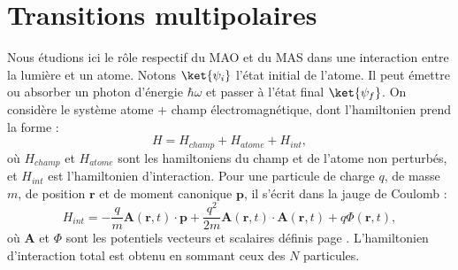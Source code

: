 \section{Transitions multipolaires}
Nous étudions ici le rôle respectif du MAO et du MAS dans une interaction entre la lumière et un atome. Notons $\ket{\psi_i}$ l'état initial de l'atome. Il peut émettre ou absorber un photon d'énergie $\hbar\omega$ et passer à l'état final $\ket{\psi_f}$. On considère le système {atome + champ électromagnétique}, dont l'hamiltonien prend la forme :
\[ H = H_{champ} + H_{atome} + H_{int},\]
où $H_{champ}$ et $H_{atome}$ sont les hamiltoniens du champ et de l'atome non perturbés, et $H_{int}$ est l'hamiltonien d'interaction. Pour une particule de charge $q$, de masse $m$, de position $\bm{r}$ et de moment canonique $\bm{p}$, il s'écrit dans la jauge de Coulomb :
\begin{equation}
H_{int} = -\frac{q}{m}\bm{A}(\bm{r},t)\cdot\bm{p}+\frac{q^2}{2m}\bm{A}(\bm{r},t)\cdot\bm{A}(\bm{r},t)+q\Phi(\bm{r},t),
\label{eq:hint}
\end{equation}
où $\bm{A}$ et $\Phi$ sont les potentiels vecteurs et scalaires définis page \pageref{eq:para10}. L'hamiltonien d'interaction total est obtenu en sommant ceux des $N$ particules. 

